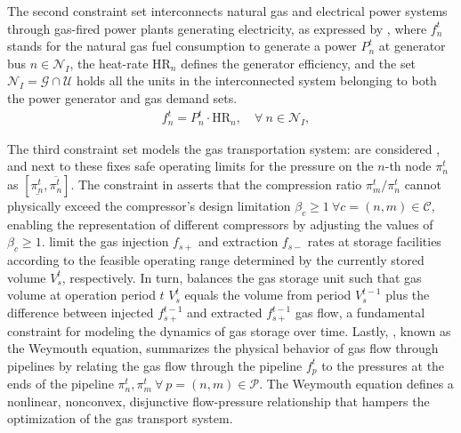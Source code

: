 The second constraint set interconnects natural gas and electrical power systems through gas-fired power plants generating electricity, as expressed by  , where $f_{n}^t$ stands for the natural gas fuel consumption to generate a power $P_{n}^t$ at generator bus $n\in\mathcal{N}_I$, the heat-rate $\text{HR}_n$ defines the generator efficiency, and the set $\mathcal{N}_I=\mathcal{G}\cap\mathcal{U}$ holds all the units in the interconnected system belonging to both the power generator and gas demand sets.
\begin{align}
    &f_{n}^t = P_{n}^t \cdot \text{HR}_n, \quad \forall \ n \in \mathcal{N}_I, \label{eq:gas_power_relation} 
\end{align}

The third constraint set models the gas transportation system:  are considered , and next to these  fixes safe operating limits for the pressure on the $n$-th node $\pi_{n}^t$ as $[\underline{\pi_{n}^t},\overline{\pi_{n}^t}]$. The constraint in  asserts that the compression ratio $\pi_{m}^t / \pi_{n}^t$ cannot physically exceed the compressor's design limitation  $\beta_{c}\geq1 \ \forall c=(n,m) \in \mathcal{C}$, enabling the representation of different compressors by adjusting the values of $\beta_{c}\geq1$.   limit the gas injection $f_{s+}$  and extraction $f_{s-}$ rates at storage facilities according to the feasible operating range determined by the currently stored volume $V_{s}^t$, respectively. In turn,  balances the gas storage unit such that gas volume at operation period $t$ $V_{s}^t$ equals the volume from period $V_{s}^{t-1}$ plus the difference between injected $f_{s+}^{t-1}$ and extracted $f_{s+}^{t-1}$ gas flow, a fundamental constraint for modeling the dynamics of gas storage over time. Lastly, , known as the Weymouth equation, summarizes the physical behavior of gas flow through pipelines by relating the gas flow through the pipeline $f_{p}^t$ to the pressures at the ends of the pipeline $\pi_{n}^t, \pi_{m}^t \ \forall \ p = (n,m) \in\mathcal{P}$. The Weymouth equation defines a nonlinear, nonconvex, disjunctive flow-pressure relationship that hampers the optimization of the gas transport system.






